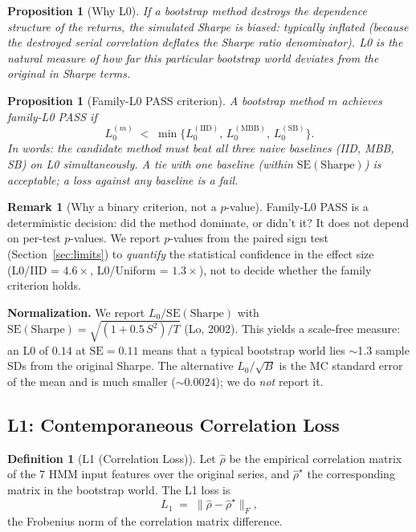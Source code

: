 \documentclass[11pt,a4paper]{article}
\newtheorem{proposition}[theorem]{Proposition}
\theoremstyle{definition}
\newtheorem{definition}{Definition}
\newtheorem{remark}{Remark}
\begin{document}
\begin{proposition}[Why L0]
If a bootstrap method destroys the dependence structure of the returns, the simulated Sharpe is biased: typically inflated (because the destroyed serial correlation deflates the Sharpe ratio denominator). L0 is the natural measure of how far \emph{this particular bootstrap world} deviates from the original in Sharpe terms.
\end{proposition}

\begin{proposition}[Family-L0 PASS criterion]
A bootstrap method $m$ achieves \emph{family-L0 PASS} if
\[
L_0^{(m)} \;<\; \min\bigl\{
L_0^{(\text{IID})},\, L_0^{(\text{MBB})},\, L_0^{(\text{SB})}
\bigr\}.
\]
In words: the candidate method must beat all three naive
baselines (IID, MBB, SB) on L0 \emph{simultaneously}. A tie with
one baseline (within $\text{SE}(\text{Sharpe})$) is acceptable; a
loss against any baseline is a fail.
\end{proposition}

\begin{remark}[Why a binary criterion, not a $p$-value]
Family-L0 PASS is a deterministic decision: did the method
dominate, or didn't it? It does not depend on per-test $p$-values.
We report $p$-values from the paired sign test (Section~\ref{sec:limits})
to \emph{quantify} the statistical confidence in the effect size
(L0/IID = $4.6\times$, L0/Uniform = $1.3\times$), not to decide
whether the family criterion holds.
\end{remark}

\textbf{Normalization.} We report $L_0 / \text{SE}(\text{Sharpe})$ with $\text{SE}(\text{Sharpe}) = \sqrt{(1 + 0.5\,S^2)/T}$ (Lo, 2002). This yields a scale-free measure: an L0 of $0.14$ at $\text{SE} = 0.11$ means that a typical bootstrap world lies $\sim$1.3 sample SDs from the original Sharpe. The alternative $L_0 / \sqrt{B}$ is the MC standard error of the mean and is much smaller ($\sim 0.0024$); we do \emph{not} report it.

\subsection{L1: Contemporaneous Correlation Loss}

\begin{definition}[L1 (Correlation Loss)]
Let $\hat{\rho}$ be the empirical correlation matrix of the 7 HMM input features over the original series, and $\hat{\rho}^{\star}$ the corresponding matrix in the bootstrap world. The L1 loss is
\[
L_1 \;=\; \|\hat{\rho} - \hat{\rho}^{\star}\|_F,
\]
the Frobenius norm of the correlation matrix difference.
\end{definition}
\end{document}
